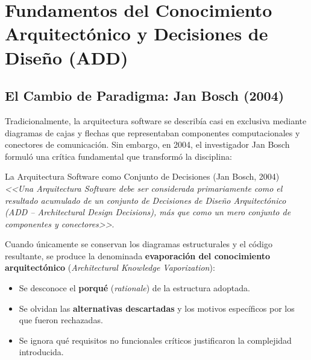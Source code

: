 \vspace{1em}

\section{Fundamentos del Conocimiento Arquitectónico y Decisiones de Diseño (ADD)}
\label{sec:fundamentos-add}

\subsection{El Cambio de Paradigma: Jan Bosch (2004)}

Tradicionalmente, la arquitectura software se describía casi en exclusiva mediante diagramas de cajas y flechas que representaban componentes computacionales y conectores de comunicación. Sin embargo, en 2004, el investigador Jan Bosch formuló una crítica fundamental que transformó la disciplina:

\begin{principio}{La Arquitectura Software como Conjunto de Decisiones (Jan Bosch, 2004)}
\emph{<<Una Arquitectura Software debe ser considerada primariamente como el resultado acumulado de un conjunto de Decisiones de Diseño Arquitectónico (ADD -- Architectural Design Decisions), más que como un mero conjunto de componentes y conectores>>}.
\end{principio}

Cuando únicamente se conservan los diagramas estructurales y el código resultante, se produce la denominada \textbf{evaporación del conocimiento arquitectónico} (\emph{Architectural Knowledge Vaporization}):
\begin{itemize}[leftmargin=1.5em]
  \item Se desconoce el \textbf{porqué} (\emph{rationale}) de la estructura adoptada.
  \item Se olvidan las \textbf{alternativas descartadas} y los motivos específicos por los que fueron rechazadas.
  \item Se ignora qué requisitos no funcionales críticos justificaron la complejidad introducida.
\end{itemize}

